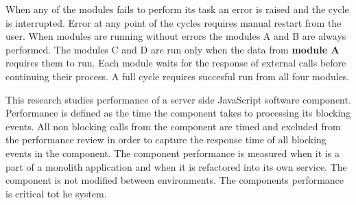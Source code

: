 When any of the modules fails to perform its task an error is raised and the cycle is interrupted.
Error at any point of the cycles requires manual restart from the user.
When modules are running without errors the modules A and B are always performed. 
The modules C and D are run only when the data from \textbf{module A} requires them to run.
Each module waits for the response of external calls before continuing their process.
A full cycle requires succesful run from all four modules.

This research studies performance of a server side JavaScript software component.
Performance is defined as the time the component takes to processing its blocking events.
All non blocking calls from the component are timed and excluded from the performance review in order to capture the response time of all blocking events in the component.
The component performance is measured when it is a part of a monolith application and when it is refactored into its own service.
The component is not modified between environments.
The components performance is critical tot he system.
